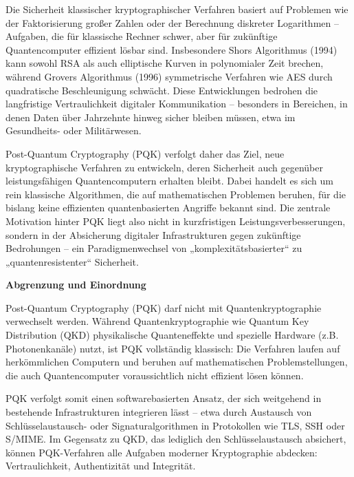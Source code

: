 \noindent
Die Sicherheit klassischer kryptographischer Verfahren basiert auf Problemen wie der Faktorisierung großer Zahlen oder der Berechnung diskreter Logarithmen – Aufgaben, die für klassische Rechner schwer, aber für zukünftige Quantencomputer effizient lösbar sind. Insbesondere Shors Algorithmus (1994) kann sowohl RSA als auch elliptische Kurven in polynomialer Zeit brechen, während Grovers Algorithmus (1996) symmetrische Verfahren wie AES durch quadratische Beschleunigung schwächt. Diese Entwicklungen bedrohen die langfristige Vertraulichkeit digitaler Kommunikation – besonders in Bereichen, in denen Daten über Jahrzehnte hinweg sicher bleiben müssen, etwa im Gesundheits- oder Militärwesen. \cite[S.38-39]{chen_l_et_al_report_2016}

\noindent 
Post-Quantum Cryptography (PQK) verfolgt daher das Ziel, neue kryptographische Verfahren zu entwickeln, deren Sicherheit auch gegenüber leistungsfähigen Quantencomputern erhalten bleibt. Dabei handelt es sich um rein klassische Algorithmen, die auf mathematischen Problemen beruhen, für die bislang keine effizienten quantenbasierten Angriffe bekannt sind. Die zentrale Motivation hinter PQK liegt also nicht in kurzfristigen Leistungsverbesserungen, sondern in der Absicherung digitaler Infrastrukturen gegen zukünftige Bedrohungen – ein Paradigmenwechsel von „komplexitätsbasierter“ zu „quantenresistenter“ Sicherheit. \cite{bernstein_et_al_post-quantum_2009}


\vspace{1em}
\noindent\textbf{Abgrenzung und Einordnung}

\noindent
Post-Quantum Cryptography (PQK) darf nicht mit Quantenkryptographie verwechselt werden. Während Quantenkryptographie wie Quantum Key Distribution (QKD) physikalische Quanteneffekte und spezielle Hardware (z.B. Photonenkanäle) nutzt, ist PQK vollständig klassisch: Die Verfahren laufen auf herkömmlichen Computern und beruhen auf mathematischen Problemstellungen, die auch Quantencomputer voraussichtlich nicht effizient lösen können. \cite{chen_l_et_al_report_2016, mosca_et_al_cybersecurity_2018}

\noindent
PQK verfolgt somit einen softwarebasierten Ansatz, der sich weitgehend in bestehende Infrastrukturen integrieren lässt – etwa durch Austausch von Schlüsselaustausch- oder Signaturalgorithmen in Protokollen wie TLS, SSH oder S/MIME. Im Gegensatz zu QKD, das lediglich den Schlüsselaustausch absichert, können PQK-Verfahren alle Aufgaben moderner Kryptographie abdecken: Vertraulichkeit, Authentizität und Integrität. \cite{bernstein_et_al_post-quantum_2009, chen_l_et_al_report_2016, national_academies_of_sciences_quantum_2019}

